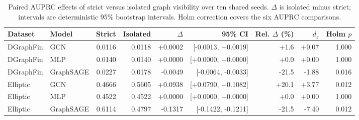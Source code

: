 \begin{table}[t]
\caption{Paired AUPRC effects of strict versus isolated graph visibility over ten shared seeds. $\Delta$ is isolated minus strict; intervals are deterministic 95\% bootstrap intervals. Holm correction covers the six AUPRC comparisons.}
\label{tab:rb09-effects}
\centering
\footnotesize
\setlength{\tabcolsep}{3.2pt}
\begin{tabular}{@{}llrrrrrrr@{}}
\toprule
Dataset & Model & Strict & Isolated & $\Delta$ & 95\% CI & Rel. $\Delta$ (\%) & $d_z$ & Holm $p$ \\
\midrule
DGraphFin & GCN & 0.0116 & 0.0118 & +0.0002 & [-0.0013, +0.0019] & +1.6 & +0.07 & 1.000 \\
DGraphFin & MLP & 0.0140 & 0.0140 & +0.0000 & [+0.0000, +0.0000] & +0.0 & +0.00 & 1.000 \\
DGraphFin & GraphSAGE & 0.0227 & 0.0178 & -0.0049 & [-0.0064, -0.0033] & -21.5 & -1.88 & 0.016 \\
Elliptic & GCN & 0.4666 & 0.5605 & +0.0938 & [+0.0790, +0.1082] & +20.1 & +3.77 & 0.012 \\
Elliptic & MLP & 0.4522 & 0.4522 & +0.0000 & [+0.0000, +0.0000] & +0.0 & +0.00 & 1.000 \\
Elliptic & GraphSAGE & 0.6114 & 0.4797 & -0.1317 & [-0.1422, -0.1211] & -21.5 & -7.40 & 0.012 \\
\bottomrule
\end{tabular}
\end{table}
